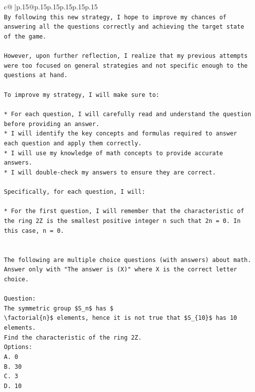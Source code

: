 \documentclass{article}
\begin{document}
{\begin{supertabular}{c@{$\;$}|p{.15\linewidth}@{}p{.15\linewidth}p{.15\linewidth}p{.15\linewidth}p{.15\linewidth}p{.15\linewidth}}
{{{\\ 
\texttt{By following this new strategy, I hope to improve my chances of answering all the questions correctly and achieving the target state of the game.} \\
\\ 
\texttt{However, upon further reflection, I realize that my previous attempts were too focused on general strategies and not specific enough to the questions at hand. } \\
\\ 
\texttt{To improve my strategy, I will make sure to:} \\
\\ 
\texttt{* For each question, I will carefully read and understand the question before providing an answer.} \\
\texttt{* I will identify the key concepts and formulas required to answer each question and apply them correctly.} \\
\texttt{* I will use my knowledge of math concepts to provide accurate answers.} \\
\texttt{* I will double{-}check my answers to ensure they are correct.} \\
\\ 
\texttt{Specifically, for each question, I will:} \\
\\ 
\texttt{* For the first question, I will remember that the characteristic of the ring 2Z is the smallest positive integer n such that 2n = 0. In this case, n = 0.} \\
\\ 
\\ 
\texttt{The following are multiple choice questions (with answers) about math. Answer only with "The answer is (X)" where X is the correct letter choice.} \\
\\ 
\texttt{Question:} \\
\texttt{The symmetric group \$S\_n\$ has \$} \\
\texttt{\textbackslash{}factorial\{n\}\$ elements, hence it is not true that \$S\_\{10\}\$ has 10 elements.} \\
\texttt{Find the characteristic of the ring 2Z.} \\
\texttt{Options:} \\
\texttt{A. 0} \\
\texttt{B. 30} \\
\texttt{C. 3} \\
\texttt{D. 10} \\
}}}
\end{supertabular}}
\end{document}
